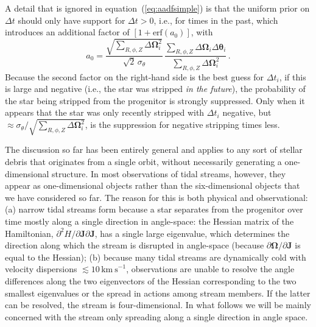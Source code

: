 \documentclass[12pt,preprint]{aastex}
\newcommand{\ie}{i.e.}
\newcommand{\eqnname}{equation}
\newcommand{\equationname}{\eqnname}
\renewcommand{\vec}[1]{\ensuremath{\mathbf{#1}}}
\newcommand{\vecj}{\ensuremath{\vec{J}}}
\newcommand{\veco}{\ensuremath{\vec{\Omega}}}
\newcommand{\veca}{\ensuremath{\boldsymbol\theta}}
\newcommand{\kms}{\ensuremath{\,\mathrm{km\ s}^{-1}}}
\begin{document}
A detail that is ignored in \equationname~(\ref{eq:aadfsimple}) is
that the uniform prior on $\Delta t$ should only have support for
$\Delta t > 0$, \ie, for times in the past, which introduces an
additional factor of $[1+\mathrm{erf}(a_0)]$, with
\[ a_0 = \frac{\sqrt{\sum_{R,\phi,Z}\Delta
  \veco_i^2}}{\sqrt{2}\,\sigma_\theta}\,\frac{\sum_{R,\phi,Z} \Delta
  \veco_i\Delta \veca_i}{\sum_{R,\phi,Z}\Delta \veco_i^2}\,.\] Because
the second factor on the right-hand side is the best guess for $\Delta
t_i$, if this is large and negative (\ie, the star was stripped
\emph{in the future}), the probability of the star being stripped from
the progenitor is strongly suppressed. Only when it appears that the
star was only recently stripped with $\Delta t_i$ negative, but
$\approx \sigma_\theta/\sqrt{\sum_{R,\phi,Z}\Delta \veco_i^2}$, is the
suppression for negative stripping times less.

The discussion so far has been entirely general and applies to any
sort of stellar debris that originates from a single orbit, without
necessarily generating a one-dimensional structure. In most
observations of tidal streams, however, they appear as one-dimensional
objects rather than the six-dimensional objects that we have
considered so far. The reason for this is both physical and
observational: (a) narrow tidal streams form because a star separates
from the progenitor over time mostly along a single direction in
angle-space: the Hessian matrix of the Hamiltonian, $\partial^2 H /
\partial \vecj \partial \vecj$, has a single large eigenvalue, which
determines the direction along which the stream is disrupted in
angle-space (because $\partial \veco / \partial \vecj$ is equal to the
Hessian); (b) because many tidal streams are dynamically cold with
velocity dispersions $\lesssim10\kms$, observations are unable to
resolve the angle differences along the two eigenvectors of the
Hessian corresponding to the two smallest eigenvalues or the spread in
actions among stream members. If the latter can be resolved, the
stream is four-dimensional. In what follows we will be mainly
concerned with the stream only spreading along a single direction in
angle space.
\end{document}
